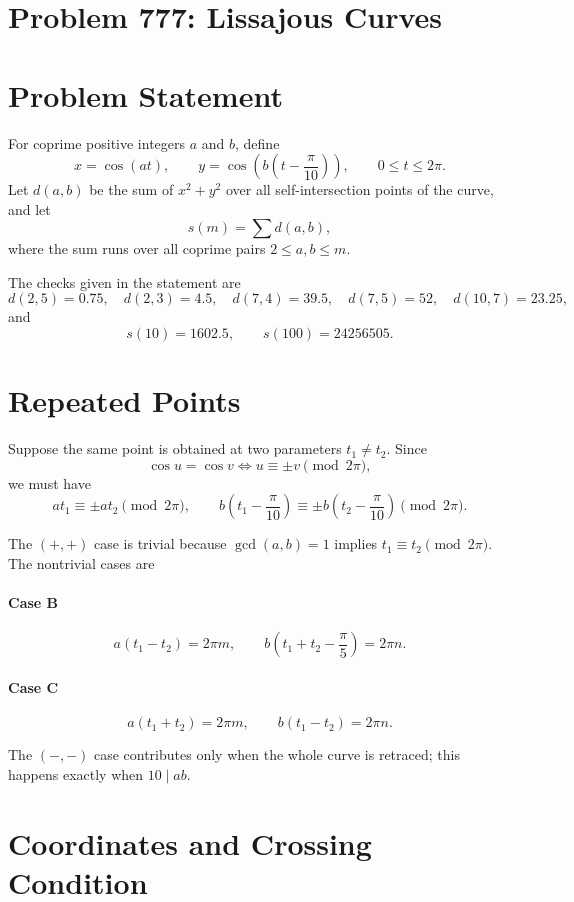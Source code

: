 \documentclass[11pt]{article}
\begin{document}
\section*{Problem 777: Lissajous Curves}

\section{Problem Statement}

For coprime positive integers $a$ and $b$, define
\[
x=\cos(at),\qquad
y=\cos\!\left(b\left(t-\frac{\pi}{10}\right)\right),
\qquad 0\le t\le 2\pi.
\]
Let $d(a,b)$ be the sum of $x^2+y^2$ over all self-intersection points of the curve, and let
\[
s(m)=\sum d(a,b),
\]
where the sum runs over all coprime pairs $2\le a,b\le m$.

The checks given in the statement are
\[
d(2,5)=0.75,\quad d(2,3)=4.5,\quad d(7,4)=39.5,\quad d(7,5)=52,\quad d(10,7)=23.25,
\]
and
\[
s(10)=1602.5,\qquad s(100)=24256505.
\]

\section{Repeated Points}

Suppose the same point is obtained at two parameters $t_1\ne t_2$. Since
\[
\cos u=\cos v \iff u\equiv \pm v \pmod{2\pi},
\]
we must have
\[
at_1\equiv \pm at_2 \pmod{2\pi},
\qquad
b\left(t_1-\frac{\pi}{10}\right)\equiv \pm b\left(t_2-\frac{\pi}{10}\right)\pmod{2\pi}.
\]

The $(+,+)$ case is trivial because $\gcd(a,b)=1$ implies $t_1\equiv t_2\pmod{2\pi}$.
The nontrivial cases are

\paragraph{Case B}
\[
a(t_1-t_2)=2\pi m,\qquad
b\left(t_1+t_2-\frac{\pi}{5}\right)=2\pi n.
\]

\paragraph{Case C}
\[
a(t_1+t_2)=2\pi m,\qquad
b(t_1-t_2)=2\pi n.
\]

The $(-,-)$ case contributes only when the whole curve is retraced; this happens exactly when $10\mid ab$.

\section{Coordinates and Crossing Condition}
\end{document}

